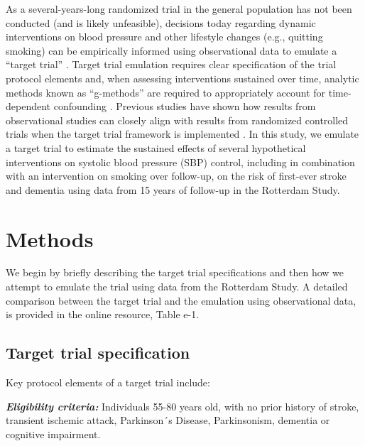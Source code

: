 \documentclass[
]{book}
\begin{document}
As a several-years-long randomized trial in the general population has not been conducted (and is likely unfeasible), decisions today regarding dynamic interventions on blood pressure and other lifestyle changes (e.g., quitting smoking) can be empirically informed using observational data to emulate a ``target trial'' \autocite{zhang2018,taubman2009,jain2016,danaei2018,garcia-aymerich2014}. Target trial emulation requires clear specification of the trial protocol elements and, when assessing interventions sustained over time, analytic methods known as ``g-methods'' are required to appropriately account for time-dependent confounding \autocite{whatif2020}. Previous studies have shown how results from observational studies can closely align with results from randomized controlled trials when the target trial framework is implemented \autocite{lodi2019,hernan2008}. In this study, we emulate a target trial to estimate the sustained effects of several hypothetical interventions on systolic blood pressure (SBP) control, including in combination with an intervention on smoking over follow-up, on the risk of first-ever stroke and dementia using data from 15 years of follow-up in the Rotterdam Study.

\hypertarget{methods-1}{%
\section{Methods}\label{methods-1}}

We begin by briefly describing the target trial specifications and then how we attempt to emulate the trial using data from the Rotterdam Study. A detailed comparison between the target trial and the emulation using observational data, is provided in the online resource, Table e-1.

\hypertarget{target-trial-specification}{%
\subsection{Target trial specification}\label{target-trial-specification}}

Key protocol elements of a target trial include:

\textbf{\emph{Eligibility criteria:}} Individuals 55-80 years old, with no prior history of stroke, transient ischemic attack, Parkinson´s Disease, Parkinsonism, dementia or cognitive impairment.
\end{document}
